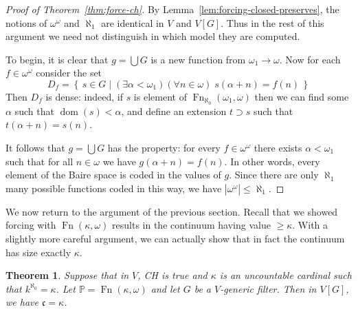 \documentclass[11pt,oneside]{amsbook}
\newcommand{\set}[1]{\left\{\,#1\,\right\}}
\newcommand{\PP}{\mathbb P}
\DeclareMathOperator{\dom}{dom}
\DeclareMathOperator{\Fn}{Fn}
\theoremstyle{definition}
\theoremstyle{plain}
\newtheorem{thm}{Theorem}[section]
\theoremstyle{definition}
\theoremstyle{remark}
\numberwithin{equation}{section}
\numberwithin{figure}{section}
\begin{document}
\begin{proof}[Proof of Theorem~\ref{thm:force-ch}]
  By Lemma~\ref{lem:forcing-closed-preserves}, the notions of $\omega^\omega$ and $\aleph_1$ are identical in $V$ and $V[G]$. Thus in the rest of this argument we need not distinguish in which model they are computed.

  To begin, it is clear that $g=\bigcup G$ is a new function from $\omega_1\to\omega$. Now for each $f\in\omega^\omega$ consider the set
  \[D_f=\set{s\in G\mid (\exists\alpha<\omega_1)(\forall n\in\omega)\;s(\alpha+n)=f(n)}
  \]
  Then $D_f$ is dense: indeed, if $s$ is element of $\Fn_{\aleph_0}(\omega_1,\omega)$ then we can find some $\alpha$ such that $\dom(s)<\alpha$, and define an extension $t\supset s$ such that $t(\alpha+n)=s(n)$.

  It follows that $g=\bigcup G$ has the property: for every $f\in\omega^\omega$ there exists $\alpha<\omega_1$ such that for all $n\in\omega$ we have $g(\alpha+n)=f(n)$. In other words, every element of the Baire space is coded in the values of $g$. Since there are only $\aleph_1$ many possible functions coded in this way, we have $|\omega^\omega|\leq\aleph_1$.
\end{proof}

We now return to the argument of the previous section. Recall that we showed forcing with $\Fn(\kappa,\omega)$ results in the continuum having value $\geq\kappa$. With a slightly more careful argument, we can actually show that in fact the continuum has size exactly $\kappa$.

\begin{thm}
  \label{thm:ch-exact}
  Suppose that in $V$, CH is true and $\kappa$ is an uncountable cardinal such that $k^{\aleph_0}=\kappa$. Let $\PP=\Fn(\kappa,\omega)$ and let $G$ be a $V$-generic filter. Then in $V[G]$, we have $\mathfrak c=\kappa$.
\end{thm}
\end{document}
